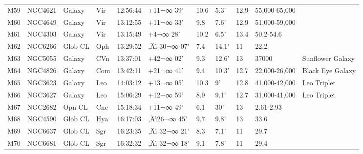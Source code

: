 \documentclass[10pt,twoside,a4paper,english]{report}
\begin{document}
\begin{longtable}{@{}lllllllllll@{}}
M59        & NGC4621     & Galaxy     & Vir       & 12:56:44 & +11¬∞ 39'  & 10.6      & 5.3'                 & 12.9     & 55,000-65,000       &                                           \\ 
M60        & NGC4649     & Galaxy     & Vir       & 13:12:55 & +11¬∞ 33'  & 9.8       & 7.6'                 & 12.9     & 51,000-59,000       &                                           \\ 
M61        & NGC4303     & Galaxy     & Vir       & 13:15:49 & +4¬∞ 28'   & 10.2      & 6.5'                 & 13.4     & 50.2-54.6           &                                           \\ 
M62        & NGC6266     & Glob CL    & Oph       & 13:29:52 & ‚Äì 30¬∞ 07' & 7.4       & 14.1'                & 11       & 22.2                &                                           \\ 
M63        & NGC5055     & Galaxy     & CVn       & 13:37:01 & +42¬∞ 02'  & 9.3       & 12.6'                & 13       & 37000               & Sunflower Galaxy                          \\ 
M64        & NGC4826     & Galaxy     & Com       & 13:42:11 & +21¬∞ 41'  & 9.4       & 10.3'                & 12.7     & 22,000-26,000       & Black Eye Galaxy                          \\ 
M65        & NGC3623     & Galaxy     & Leo       & 14:03:12 & +13¬∞ 05'  & 10.3      & 9'                   & 12.8     & 41,000-42,000       & Leo Triplet                               \\ 
M66        & NGC3627     & Galaxy     & Leo       & 15:06:29 & +12¬∞ 59'  & 8.9       & 9.1'                 & 12.7     & 31,000-41,000       & Leo Triplet                               \\ 
M67        & NGC2682     & Opn CL     & Cnc       & 15:18:34 & +11¬∞ 49'  & 6.1       & 30'                  & 13       & 2.61-2.93           &                                           \\ 
M68        & NGC4590     & Glob CL    & Hya       & 16:17:03 & ‚Äì26¬∞ 45'  & 9.7       & 9.8'                 & 13       & 33.6                &                                           \\ 
M69        & NGC6637     & Glob CL    & Sgr       & 16:23:35 & ‚Äì 32¬∞ 21' & 8.3       & 7.1'                 & 11       & 29.7                &                                           \\ 
M70        & NGC6681     & Glob CL    & Sgr       & 16:32:32 & ‚Äì 32¬∞ 18' & 9.1       & 7.8'                 & 11       & 29.4                &                                           \\ 

\end{longtable}
\end{document}
